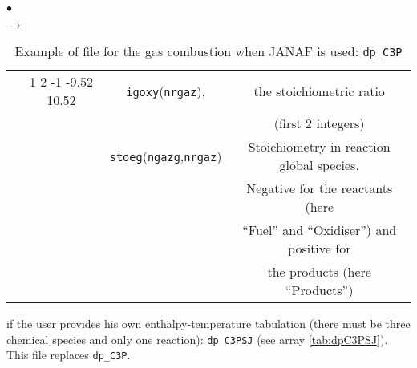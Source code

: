 {{\begin{list}{$\bullet$}{}
\begin{list}{$\rightarrow$}{}
\begin{table}[htbp]
\begin{center}
{\begin{tabular}{|c|c|c|c|}
        & 1 2 -1 -9.52 10.52&  \texttt{igoxy\index{igoxy}}(\texttt{nrgaz}),  & the stoichiometric ratio                         \\
        &                   &                              & (first 2 integers)                               \\
        &                   &\texttt{stoeg\index{stoeg}}(\texttt{ngazg},\texttt{nrgaz})& Stoichiometry in reaction global species.       \\
        &                   &                               & Negative for the reactants (here                \\
        &                   &                               & ``Fuel'' and ``Oxidiser'') and positive for      \\
        &                   &                               & the products (here ``Products'')                \\ \hline
\end{tabular}
}
\caption{Example of file for the gas combustion when JANAF is used: \texttt{dp\_C3P}}\label{tab:dpC3P}
\end{center}
\end{table}

               \item if the user provides his own enthalpy-temperature tabulation
                     (there must be three chemical species and only
                     one reaction): \texttt{dp\_C3PSJ} (see
                     array \ref{tab:dpC3PSJ}). This file replaces \texttt{dp\_C3P}.


\end{list}
\end{list}}}
